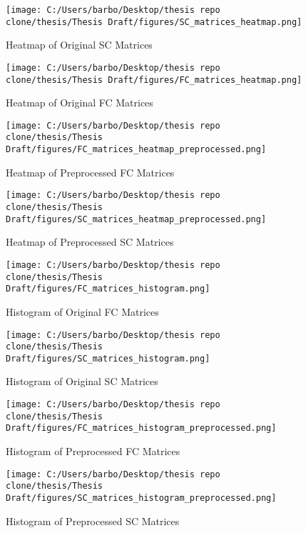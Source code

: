 \begin{figure}[h!]
\centering
\texttt{[image: C:/Users/barbo/Desktop/thesis repo clone/thesis/Thesis Draft/figures/SC\_matrices\_heatmap.png]}
\caption{Heatmap of Original SC Matrices}
\end{figure}

\begin{figure}[h!]
\centering
\texttt{[image: C:/Users/barbo/Desktop/thesis repo clone/thesis/Thesis Draft/figures/FC\_matrices\_heatmap.png]}
\caption{Heatmap of Original FC Matrices}
\end{figure}

\begin{figure}[h!]
\centering
\texttt{[image: C:/Users/barbo/Desktop/thesis repo clone/thesis/Thesis Draft/figures/FC\_matrices\_heatmap\_preprocessed.png]}
\caption{Heatmap of Preprocessed FC Matrices}
\end{figure}

\begin{figure}[h!]
\centering
\texttt{[image: C:/Users/barbo/Desktop/thesis repo clone/thesis/Thesis Draft/figures/SC\_matrices\_heatmap\_preprocessed.png]}
\caption{Heatmap of Preprocessed SC Matrices}
\end{figure}

\begin{figure}[h!]
\centering
\texttt{[image: C:/Users/barbo/Desktop/thesis repo clone/thesis/Thesis Draft/figures/FC\_matrices\_histogram.png]}
\caption{Histogram of Original FC Matrices}
\end{figure}

\begin{figure}[h!]
\centering
\texttt{[image: C:/Users/barbo/Desktop/thesis repo clone/thesis/Thesis Draft/figures/SC\_matrices\_histogram.png]}
\caption{Histogram of Original SC Matrices}
\end{figure}

\begin{figure}[h!]
\centering
\texttt{[image: C:/Users/barbo/Desktop/thesis repo clone/thesis/Thesis Draft/figures/FC\_matrices\_histogram\_preprocessed.png]}
\caption{Histogram of Preprocessed FC Matrices}
\end{figure}

\begin{figure}[h!]
\centering
\texttt{[image: C:/Users/barbo/Desktop/thesis repo clone/thesis/Thesis Draft/figures/SC\_matrices\_histogram\_preprocessed.png]}
\caption{Histogram of Preprocessed SC Matrices}
\end{figure}

